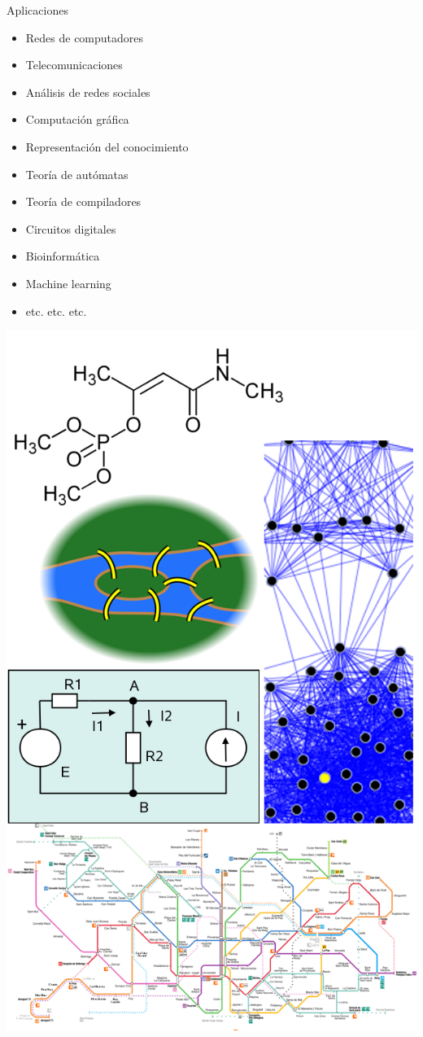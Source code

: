 \documentclass{beamer} %
\begin{document}
\begin{frame}{Aplicaciones}
    \begin{minipage}{0.55\textwidth}
      {\small
      \begin{itemize}
        \item Redes de computadores
        \item Telecomunicaciones
        \item Análisis de redes sociales
        \item Computación gráfica
        \item Representación del conocimiento
        \item Teoría de autómatas
        \item Teoría de compiladores
        \item Circuitos digitales
        \item Bioinformática
        \item Machine learning
        \item etc. etc. etc.
      \end{itemize}}
    \end{minipage}
    \begin{minipage}{0.4\textwidth}
      \includegraphics[width=\textwidth]{./image/cap6/grafos-aplicaciones.png}

\end{minipage}
\end{frame}
\end{document}

